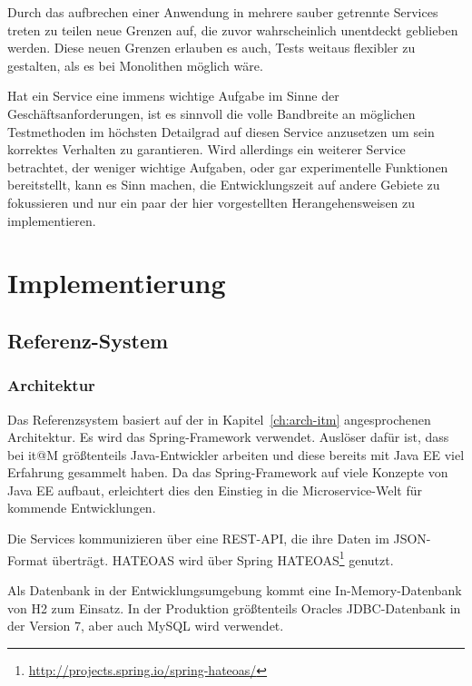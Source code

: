 \documentclass[12pt,a4paper,bibliography=totocnumbered,listof=totocnumbered]{scrartcl}
\begin{document}
Durch das aufbrechen einer Anwendung in mehrere sauber getrennte Services treten zu teilen neue Grenzen auf, die zuvor wahrscheinlich unentdeckt geblieben werden. Diese neuen Grenzen erlauben es auch, Tests weitaus flexibler zu gestalten, als es bei Monolithen möglich wäre.

Hat ein Service eine immens wichtige Aufgabe im Sinne der Geschäftsanforderungen, ist es sinnvoll die volle Bandbreite an möglichen Testmethoden im höchsten Detailgrad auf diesen Service anzusetzen um sein korrektes Verhalten zu garantieren. Wird allerdings ein weiterer Service betrachtet, der weniger wichtige Aufgaben, oder gar experimentelle Funktionen bereitstellt, kann es Sinn machen, die Entwicklungszeit auf andere Gebiete zu fokussieren und nur ein paar der hier vorgestellten Herangehensweisen zu implementieren.\cite{clemson}

\section{Implementierung}\label{ch:implementierung}

\subsection{Referenz-System}

\subsubsection{Architektur}

Das Referenzsystem basiert auf der in Kapitel~\ref{ch:arch-itm} angesprochenen Architektur. Es wird das Spring-Framework verwendet. Auslöser dafür ist, dass bei it@M größtenteils Java-Entwickler arbeiten und diese bereits mit Java EE viel Erfahrung gesammelt haben. Da das Spring-Framework auf viele Konzepte von Java EE aufbaut, erleichtert dies den Einstieg in die Microservice-Welt für kommende Entwicklungen.

Die Services kommunizieren über eine REST-\ac{API}, die ihre Daten im JSON-Format überträgt. \ac{HATEOAS} wird über Spring \ac{HATEOAS}\footnote{\url{http://projects.spring.io/spring-hateoas/}} genutzt.

Als Datenbank in der Entwicklungsumgebung kommt eine In-Memory-Datenbank von H2 zum Einsatz. In der Produktion größtenteils Oracles JDBC-Datenbank in der Version 7, aber auch MySQL wird verwendet.
\end{document}

